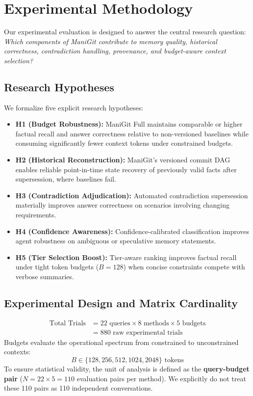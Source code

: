 \section{Experimental Methodology}
\label{sec:methodology}

Our experimental evaluation is designed to answer the central research question: \textit{Which components of ManiGit contribute to memory quality, historical correctness, contradiction handling, provenance, and budget-aware context selection?}

\subsection{Research Hypotheses}
We formalize five explicit research hypotheses:
\begin{itemize}
    \item \textbf{H1 (Budget Robustness):} ManiGit Full maintains comparable or higher factual recall and answer correctness relative to non-versioned baselines while consuming significantly fewer context tokens under constrained budgets.
    \item \textbf{H2 (Historical Reconstruction):} ManiGit's versioned commit DAG enables reliable point-in-time state recovery of previously valid facts after supersession, where baselines fail.
    \item \textbf{H3 (Contradiction Adjudication):} Automated contradiction supersession materially improves answer correctness on scenarios involving changing requirements.
    \item \textbf{H4 (Confidence Awareness):} Confidence-calibrated classification improves agent robustness on ambiguous or speculative memory statements.
    \item \textbf{H5 (Tier Selection Boost):} Tier-aware ranking improves factual recall under tight token budgets ($B=128$) when concise constraints compete with verbose summaries.
\end{itemize}

\subsection{Experimental Design and Matrix Cardinality}
\begin{equation}
\begin{aligned}
\text{Total Trials} &= 22\text{ queries} \times 8\text{ methods} \times 5\text{ budgets} \\
&= 880\text{ raw experimental trials}
\end{aligned}
\end{equation}
Budgets evaluate the operational spectrum from constrained to unconstrained contexts:
$$B \in \{128, 256, 512, 1024, 2048\}\text{ tokens}$$
To ensure statistical validity, the unit of analysis is defined as the \textbf{query-budget pair} ($N = 22 \times 5 = 110$ evaluation pairs per method). We explicitly do not treat these 110 pairs as 110 independent conversations.

